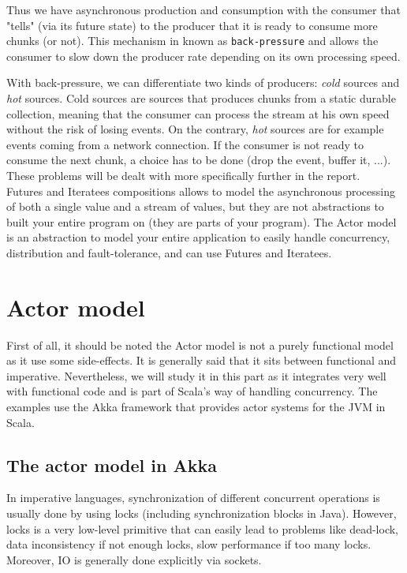 Thus we have asynchronous production and consumption with the consumer that "tells" (via its future state) to the producer that it is ready to 
consume more chunks (or not). This mechanism in known as \verb|back-pressure| and allows the consumer to slow down the producer rate depending on its 
own processing speed. 

With back-pressure, we can differentiate two kinds of producers: \textit{cold} sources and \textit{hot} sources. Cold sources are sources that
produces chunks from a static durable collection, meaning that the consumer can process the stream at his own speed without the risk of losing events.
On the contrary, \textit{hot} sources are for example events coming from a network connection. If the consumer is not ready to consume the next chunk,
a choice has to be done (drop the event, buffer it, ...). These problems will be dealt with more specifically further in the report.
\\

Futures and Iteratees compositions allows to model the asynchronous processing of both a single value and a stream of values, but 
they are not abstractions to built your entire program on (they are parts of your program).
The Actor model is an abstraction to model your entire application to easily handle concurrency, distribution and fault-tolerance, and can use Futures and Iteratees.

\section{Actor model}

First of all, it should be noted the Actor model is not a purely functional model as it use some side-effects. It is generally said that it sits between functional and
imperative. Nevertheless, we will study it in this part as it integrates very well with functional code and is part of Scala's way of handling concurrency.
The examples use the Akka framework  that provides actor systems for the JVM in Scala.
\\

\subsection{The actor model in Akka}

In imperative languages, synchronization of different concurrent operations is usually done by using locks (including synchronization blocks in Java). 
However, locks is a very low-level primitive that can easily lead to problems like dead-lock, data inconsistency if not enough locks, 
slow performance if too many locks. Moreover, IO is generally done explicitly via sockets.

